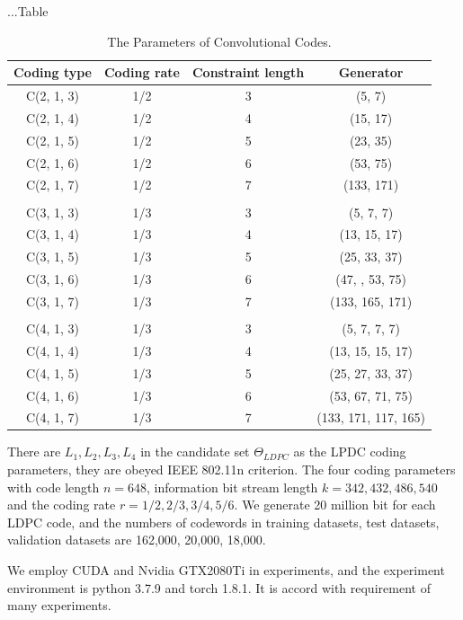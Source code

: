 \documentclass[conference]{IEEEtran}
\begin{document}
...Table

\begin{table}[htbp]
	\caption{The Parameters of Convolutional Codes.}
	\begin{center}
		\begin{tabular}{cccc}
			\hline
			\specialrule{0em}{1pt}{1pt}
			Coding type & Coding rate & Constraint length & Generator  \\ 
			\hline
			\specialrule{0em}{1pt}{1pt}
			C(2, 1, 3) & 1/2 & 3& (5, 7) \\
			C(2, 1, 4) & 1/2 & 4& (15, 17) \\
			C(2, 1, 5) & 1/2 & 5& (23, 35) \\
			C(2, 1, 6) & 1/2 & 6& (53, 75) \\
			C(2, 1, 7) & 1/2 & 7& (133, 171) \\
			\multicolumn{4}{c}{} \\ 
			C(3, 1, 3) & 1/3 & 3& (5, 7, 7) \\
			C(3, 1, 4) & 1/3 & 4& (13, 15, 17) \\
			C(3, 1, 5) & 1/3 & 5& (25, 33, 37) \\
			C(3, 1, 6) & 1/3 & 6& (47, , 53, 75) \\
			C(3, 1, 7) & 1/3 & 7& (133, 165, 171) \\
			\multicolumn{4}{c}{} \\
			C(4, 1, 3) & 1/3 & 3& (5, 7, 7, 7) \\
			C(4, 1, 4) & 1/3 & 4& (13, 15, 15, 17) \\
			C(4, 1, 5) & 1/3 & 5& (25, 27, 33, 37) \\
			C(4, 1, 6) & 1/3 & 6& (53, 67, 71, 75) \\
			C(4, 1, 7) & 1/3 & 7& (133, 171, 117, 165) \\
			\hline
		\end{tabular}
		\label{tab1e}
	\end{center}
\end{table}

There are $L_1, L_2, L_3, L_4$ in the candidate set $\Theta_{LDPC}$ as the LPDC coding parameters, they are obeyed IEEE 802.11n criterion. The four coding parameters with code length $n = 648$, information bit stream length $k = 342, 432, 486, 540$ and the coding rate $r = 1/2, 2/3, 3/4, 5/6$. We generate 20 million bit for each LDPC code, and the numbers of codewords in training datasets, test datasets, validation datasets are 162,000, 20,000, 18,000.

We employ CUDA and Nvidia GTX2080Ti in experiments, and the experiment environment is python 3.7.9 and torch 1.8.1. It is accord with requirement of many experiments.
\end{document}
